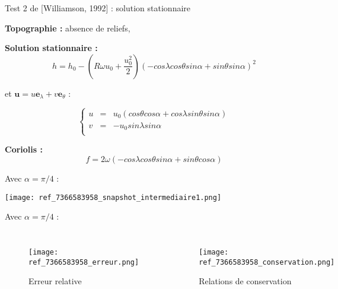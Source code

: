 \documentclass[11pt]{beamer}
\begin{document}
\begin{frame}{Test 2 de [Williamson, 1992] : solution stationnaire}

\textbf{Topographie :} absence de reliefs,

\textbf{Solution stationnaire :}
\begin{equation}
h = h_0 - \left( R \omega u_0 + \dfrac{u_0^2}{2} \right) \left( - cos \lambda cos \theta sin \alpha + sin \theta sin \alpha \right)^2
\end{equation}

et $\mathbf{u}=u \mathbf{e}_{\lambda}+ v \mathbf{e}_{\theta}$ :

\begin{equation}
\left\lbrace
\begin{array}{rcl}
u & = & u_0 \left( cos \theta cos \alpha + cos \lambda sin \theta sin \alpha  \right)\\
v & = & - u_0 sin \lambda sin \alpha \\
\end{array}
\right.
\end{equation}

\textbf{Coriolis :}
\begin{equation}
f=2 \omega \left( - cos \lambda cos \theta sin \alpha + sin \theta cos \alpha \right)
\end{equation}
\end{frame}

\begin{frame}
Avec $\alpha = \pi / 4$ :

\begin{center}
\texttt{[image: ref\_7366583958\_snapshot\_intermediaire1.png]}
\end{center}
\end{frame}


\begin{frame}
Avec $\alpha = \pi / 4$ :

\begin{columns}
\begin{figure}
\texttt{[image: ref\_7366583958\_erreur.png]}
\caption{Erreur relative}
\end{figure}

\begin{figure}
\texttt{[image: ref\_7366583958\_conservation.png]}
\caption{Relations de conservation}
\end{figure}


\end{columns}
\end{frame}
\end{document}
